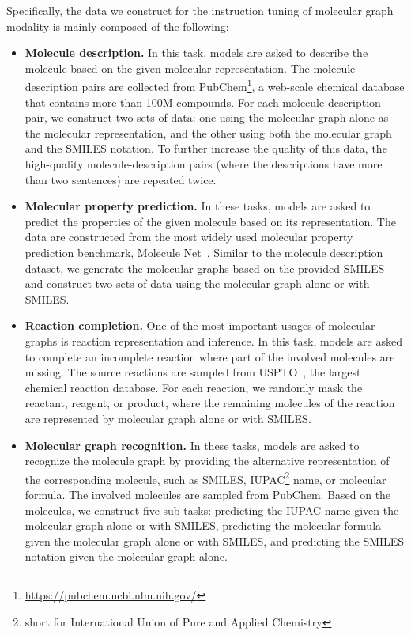Specifically, the data we construct for the instruction tuning of molecular graph modality is mainly composed of the following:
\begin{itemize}
    \item \textbf{Molecule description.} In this task, models are asked to describe the molecule based on the given molecular representation. The molecule-description pairs are collected from PubChem\footnote{\url{https://pubchem.ncbi.nlm.nih.gov/}}, a web-scale chemical database that contains more than 100M compounds. For each molecule-description pair, we construct two sets of data: one using the molecular graph alone as the molecular representation, and the other using both the molecular graph and the SMILES notation. To further increase the quality of this data, the high-quality molecule-description pairs (where the descriptions have more than two sentences) are repeated twice.
    \item \textbf{Molecular property prediction.} In these tasks, models are asked to predict the properties of the given molecule based on its representation. The data are constructed from the most widely used molecular property prediction benchmark, Molecule Net~\cite{moleculenet}. Similar to the molecule description dataset, we generate the molecular graphs based on the provided SMILES and construct two sets of data using the molecular graph alone or with SMILES.
    \item \textbf{Reaction completion.} One of the most important usages of molecular graphs is reaction representation and inference. In this task, models are asked to complete an incomplete reaction where part of the involved molecules are missing. The source reactions are sampled from USPTO~\cite{uspto}, the largest chemical reaction database. For each reaction, we randomly mask the reactant, reagent, or product, where the remaining molecules of the reaction are represented by molecular graph alone or with SMILES.
    \item \textbf{Molecular graph recognition.} In these tasks, models are asked to recognize the molecule graph by providing the alternative representation of the corresponding molecule, such as SMILES, IUPAC\footnote{short for International Union of Pure and Applied Chemistry} name, or molecular formula. The involved molecules are sampled from PubChem. Based on the molecules, we construct five sub-tasks: predicting the IUPAC name given the molecular graph alone or with SMILES, predicting the molecular formula given the molecular graph alone or with SMILES, and predicting the SMILES notation given the molecular graph alone.
\end{itemize}


